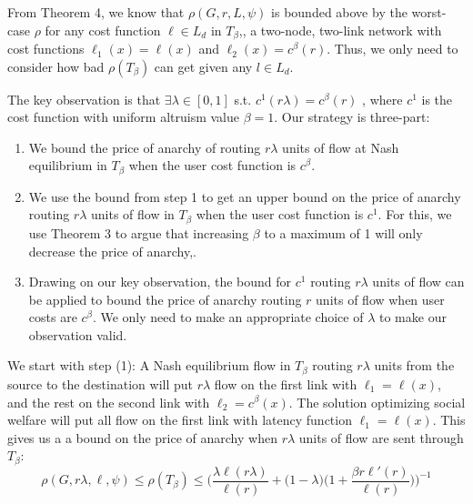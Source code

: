 \begin{proof-sketch}
From Theorem 4, we know that 
$\rho(G,r,{L},\psi)$%
is bounded above by the worst-case $\rho$ for any cost function $\ell \in L_d$ in $T_\beta$,,  a two-node, two-link network with cost functions $\ell_1(x) = \ell(x)$ and $\ell_2(x) = c^\beta(r)$.
Thus, we only need to consider how bad $\rho(T_\beta)$ can get given any $l\in L_d$.

The key observation is that $\exists\lambda \in [0,1]$ s.t. $c^1(r\lambda) = c^\beta(r)$ , where $c^1$ is the cost function with uniform altruism value $\beta=1$. Our strategy is three-part: 
\begin{enumerate}
    \item We bound the price of anarchy of routing $r\lambda$ units of flow at Nash equilibrium in $T_\beta$ when the user cost function is $c^\beta$.
   \item We use the bound from step 1 to get an upper bound on the price of anarchy routing $r\lambda$ units of flow in $T_\beta$ when the user cost function is $c^1$. For this, we use Theorem 3 to argue that increasing $\beta$ to a maximum of 1 will only decrease the price of anarchy,. 
    \item Drawing on our key observation, the bound for $c^1$ routing $r\lambda$ units of flow can be applied to bound the price of anarchy routing $r$ units of flow when user costs are $c^\beta$.
We only need to make an appropriate choice of $\lambda$ to make our observation valid.
\end{enumerate}

We start with step (1): A Nash equilibrium flow in $T_\beta$ routing $r\lambda$ units from the source to the destination will put $r\lambda$ flow on the first link with $\ell_1 = \ell(x)$, and the rest  on the second link with $\ell_2 = c^\beta(x)$. The solution optimizing social welfare will put all flow on the first link with latency function $\ell_1 = \ell(x)$.
This gives us a a bound on the price of anarchy when $r\lambda$ units of flow are sent through $T_\beta$:
    $$\rho(G,r\lambda,\ell,\psi) \le \rho(T_\beta) \le \Big(\frac{\lambda \ell(r\lambda)}{\ell(r)} + \Big(1-\lambda\Big)\Big(1+\frac{\beta r\ell'(r)}{\ell(r)}\Big)\Big)^{-1}$$
    

\end{proof-sketch}
